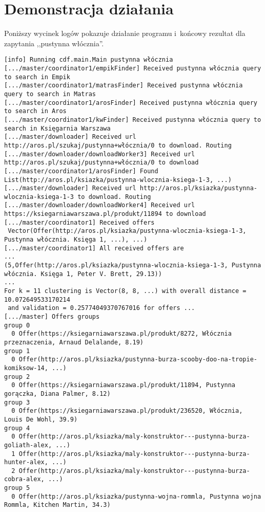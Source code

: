 \documentclass[a4paper,12pt]{mwart}
\begin{document}
\section{Demonstracja działania}

Poniższy wycinek logów pokazuje działanie programu i~końcowy rezultat dla
zapytania ,,pustynna włócznia''.

\scriptsize
\begin{verbatim}
[info] Running cdf.main.Main pustynna włócznia
[.../master/coordinator1/empikFinder] Received pustynna włócznia query to search in Empik
[.../master/coordinator1/matrasFinder] Received pustynna włócznia query to search in Matras
[.../master/coordinator1/arosFinder] Received pustynna włócznia query to search in Aros
[.../master/coordinator1/kwFinder] Received pustynna włócznia query to search in Księgarnia Warszawa
[.../master/downloader] Received url http://aros.pl/szukaj/pustynna+włócznia/0 to download. Routing
[.../master/downloader/downloadWorker3] Received url http://aros.pl/szukaj/pustynna+włócznia/0 to download
[.../master/coordinator1/arosFinder] Found List(http://aros.pl/ksiazka/pustynna-wlocznia-ksiega-1-3, ...)
[.../master/downloader] Received url http://aros.pl/ksiazka/pustynna-wlocznia-ksiega-1-3 to download. Routing
[.../master/downloader/downloadWorker4] Received url https://ksiegarniawarszawa.pl/produkt/11894 to download
[.../master/coordinator1] Received offers
 Vector(Offer(http://aros.pl/ksiazka/pustynna-wlocznia-ksiega-1-3, Pustynna włócznia. Księga 1, ...), ...)
[.../master/coordinator1] All received offers are
...
(5,Offer(http://aros.pl/ksiazka/pustynna-wlocznia-ksiega-1-3, Pustynna włócznia. Księga 1, Peter V. Brett, 29.13))
...
For k = 11 clustering is Vector(8, 8, ...) with overall distance = 10.072649533170214
 and validation = 0.25774049370767016 for offers ...
[.../master] Offers groups
group 0
  0 Offer(https://ksiegarniawarszawa.pl/produkt/8272, Włócznia przeznaczenia, Arnaud Delalande, 8.19)
group 1
  0 Offer(http://aros.pl/ksiazka/pustynna-burza-scooby-doo-na-tropie-komiksow-14, ...)
group 2
  0 Offer(https://ksiegarniawarszawa.pl/produkt/11894, Pustynna gorączka, Diana Palmer, 8.12)
group 3
  0 Offer(https://ksiegarniawarszawa.pl/produkt/236520, Włócznia, Louis De Wohl, 39.9)
group 4
  0 Offer(http://aros.pl/ksiazka/maly-konstruktor---pustynna-burza-goliath-alex, ...)
  1 Offer(http://aros.pl/ksiazka/maly-konstruktor---pustynna-burza-hunter-alex, ...)
  2 Offer(http://aros.pl/ksiazka/maly-konstruktor---pustynna-burza-cobra-alex, ...)
group 5
  0 Offer(http://aros.pl/ksiazka/pustynna-wojna-rommla, Pustynna wojna Rommla, Kitchen Martin, 34.3)

\end{verbatim}
\end{document}
